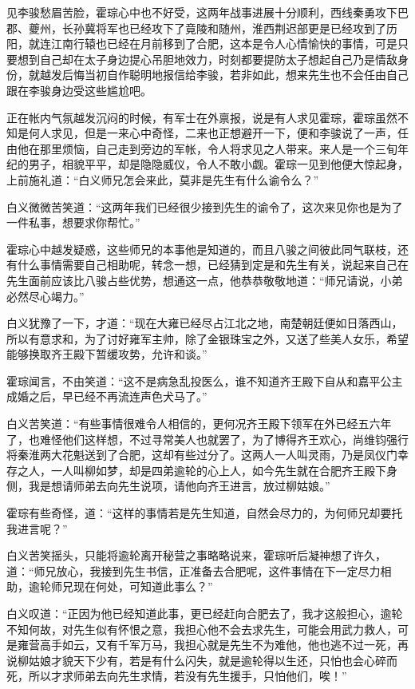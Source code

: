 见李骏愁眉苦脸，霍琮心中也不好受，这两年战事进展十分顺利，西线秦勇攻下巴郡、夔州，长孙冀将军也已经攻下了竟陵和随州，淮西荆迟部更是已经攻到了历阳，就连江南行辕也已经在月前移到了合肥，这本是令人心情愉快的事情，可是只要想到自己却在太子身边提心吊胆地效力，时刻都要提防太子想起自己乃是情敌身份，就越发后悔当初自作聪明地报信给李骏，若非如此，想来先生也不会任由自己跟在李骏身边受这些尴尬吧。

正在帐内气氛越发沉闷的时候，有军士在外禀报，说是有人求见霍琮，霍琮虽然不知是何人求见，但是一来心中奇怪，二来也正想避开一下，便和李骏说了一声，任由他在那里烦恼，自己走到旁边的军帐，令人将求见之人带来。来人是一个三旬年纪的男子，相貌平平，却是隐隐威仪，令人不敢小觑。霍琮一见到他便大惊起身，上前施礼道：“白义师兄怎会来此，莫非是先生有什么谕令么？”

白义微微苦笑道：“这两年我们已经很少接到先生的谕令了，这次来见你也是为了一件私事，想要求你帮忙。”

霍琮心中越发疑惑，这些师兄的本事他是知道的，而且八骏之间彼此同气联枝，还有什么事情需要自己相助呢，转念一想，已经猜到定是和先生有关，说起来自己在先生面前应该比八骏占些优势，想通这一点，他恭恭敬敬地道：“师兄请说，小弟必然尽心竭力。”

白义犹豫了一下，才道：“现在大雍已经尽占江北之地，南楚朝廷便如日落西山，所以有意求和，为了讨好雍军主帅，除了金银珠宝之外，又送了些美人女乐，希望能够换取齐王殿下暂缓攻势，允许和谈。”

霍琮闻言，不由笑道：“这不是病急乱投医么，谁不知道齐王殿下自从和嘉平公主成婚之后，早已经不再流连声色犬马了。”

白义苦笑道：“有些事情很难令人相信的，更何况齐王殿下领军在外已经五六年了，也难怪他们这样想，不过寻常美人也就罢了，为了博得齐王欢心，尚维钧强行将秦淮两大花魁送到了合肥，这却有些过分了。这两人一人叫灵雨，乃是凤仪门幸存之人，一人叫柳如梦，却是四弟逾轮的心上人，如今先生就在合肥齐王殿下身侧，我是想请师弟去向先生说项，请他向齐王进言，放过柳姑娘。”

霍琮有些奇怪，道：“这样的事情若是先生知道，自然会尽力的，为何师兄却要托我进言呢？”

白义苦笑摇头，只能将逾轮离开秘营之事略略说来，霍琮听后凝神想了许久，道：“师兄放心，我接到先生书信，正准备去合肥呢，这件事情在下一定尽力相助，逾轮师兄现在何处，可知道此事么？”

白义叹道：“正因为他已经知道此事，更已经赶向合肥去了，我才这般担心，逾轮不知何故，对先生似有怀恨之意，我担心他不会去求先生，可能会用武力救人，可是雍营高手如云，又有千军万马，我担心就是先生不为难他，他也逃不过一死，再说柳姑娘才貌天下少有，若是有什么闪失，就是逾轮得以生还，只怕也会心碎而死，所以才求师弟去向先生求情，若没有先生援手，只怕他们，唉！”

